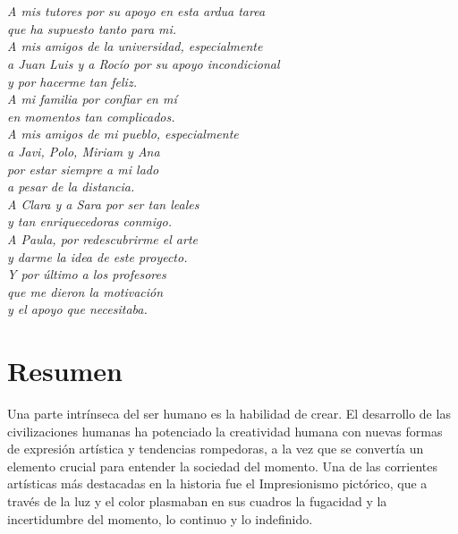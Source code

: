 \documentclass[a4paper]{report}
\newcommand\paginablanco{%
    \null
    \thispagestyle{empty}%
    \newpage}
\newcommand\paginablancosin{%
    \paginablanco{}
    \addtocounter{page}{-1}}
\begin{document}
\paginablancosin{}


\chapter*{}
\thispagestyle{empty}
\begin{flushright}
\textit{A mis tutores por su apoyo en esta ardua tarea \\
que ha supuesto tanto para mi. \\
A mis amigos de la universidad, especialmente \\
a Juan Luis y a Rocío por su apoyo incondicional \\
y por hacerme tan feliz. \\
A mi familia por confiar en mí \\
en momentos tan complicados. \\
A mis amigos de mi pueblo, especialmente  \\
a Javi, Polo, Miriam y Ana \\
por estar siempre a mi lado \\
a pesar de la distancia. \\
A Clara y a Sara por ser tan leales \\
y tan enriquecedoras conmigo. \\
A Paula, por redescubrirme el arte \\
y darme la idea de este proyecto. \\
Y por último a los profesores \\
que me dieron la motivación \\
y el apoyo que necesitaba.}
\end{flushright}


\chapter*{Resumen} %
Una parte intrínseca del ser humano es la habilidad de crear. El desarrollo de las civilizaciones humanas ha potenciado la creatividad humana con nuevas formas de expresión artística y tendencias rompedoras, a la vez que se convertía un elemento crucial para entender la sociedad del momento. Una de las corrientes artísticas más destacadas en la historia fue el Impresionismo pictórico, que a través de la luz y el color plasmaban en sus cuadros la fugacidad y la incertidumbre del momento, lo continuo y lo indefinido. \newline
\end{document}

